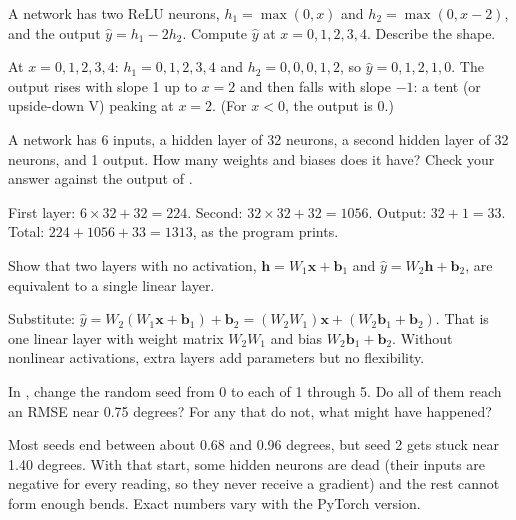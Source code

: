 \begin{Exercise}[label=nnr3, title=Build a tent, space=3cm]
A network has two ReLU neurons, $h_1 = \max(0, x)$ and $h_2 = \max(0, x - 2)$, and the output
$\hat{y} = h_1 - 2h_2$. Compute $\hat{y}$ at $x = 0, 1, 2, 3, 4$. Describe the shape.
\end{Exercise}
\begin{Answer}[ref=nnr3]
At $x = 0, 1, 2, 3, 4$: $h_1 = 0, 1, 2, 3, 4$ and $h_2 = 0, 0, 0, 1, 2$, so $\hat{y} = 0, 1, 2, 1, 0$. The output rises
with slope 1 up to $x = 2$ and then falls with slope $-1$: a tent (or upside-down V) peaking at $x = 2$. (For
$x < 0$, the output is 0.)
\end{Answer}

\begin{Exercise}[label=nnr4, title={Count the parameters}]
A network has 6 inputs, a hidden layer of 32 neurons, a second hidden layer of 32 neurons, and 1 output. How many
weights and biases does it have? Check your answer against the output of .
\end{Exercise}
\begin{Answer}[ref=nnr4]
First layer: $6 \times 32 + 32 = 224$. Second: $32 \times 32 + 32 = 1056$. Output: $32 + 1 = 33$. Total:
$224 + 1056 + 33 = 1313$, as the program prints.
\end{Answer}

\begin{Exercise}[label=nnr5, title={Collapse}]
Show that two layers with no activation, $\mathbf{h} = W_1\mathbf{x} + \mathbf{b}_1$ and
$\hat{y} = W_2\mathbf{h} + \mathbf{b}_2$, are equivalent to a single linear layer.
\end{Exercise}
\begin{Answer}[ref=nnr5]
Substitute: $\hat{y} = W_2(W_1\mathbf{x} + \mathbf{b}_1) + \mathbf{b}_2 = (W_2W_1)\mathbf{x} + (W_2\mathbf{b}_1 + \mathbf{b}_2)$.
That is one linear layer with weight matrix $W_2W_1$ and bias $W_2\mathbf{b}_1 + \mathbf{b}_2$. Without nonlinear
activations, extra layers add parameters but no flexibility.
\end{Answer}

\begin{Exercise}[label=nnr6, title={Try other starts}]
In , change the random seed from 0 to each of 1 through 5. Do all of them reach an RMSE
near 0.75 degrees? For any that do not, what might have happened?
\end{Exercise}
\begin{Answer}[ref=nnr6]
Most seeds end between about 0.68 and 0.96 degrees, but seed 2 gets stuck near 1.40 degrees. With that start, some
hidden neurons are dead (their inputs are negative for every reading, so they never receive a gradient) and the
rest cannot form enough bends. Exact numbers vary with the PyTorch version.
\end{Answer}
